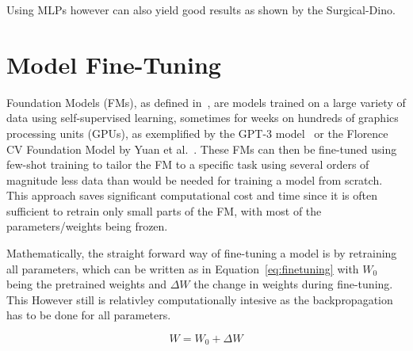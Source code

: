 Using MLPs however can also yield good results as shown by the Surgical-Dino.



\section{Model Fine-Tuning}\label{sec:model-fine-tuning}
Foundation Models (FMs), as defined in~\cite{Bommasani2021}, are models trained on a large variety of data using self-supervised learning, sometimes for weeks on hundreds of graphics processing units (GPUs), as exemplified by the GPT-3 model~\cite{Yuan2022} or the Florence CV Foundation Model by Yuan et al.~\cite{Yuan2021}.
These FMs can then be fine-tuned using few-shot training to tailor the FM to a specific task using several orders of magnitude less data than would be needed for training a model from scratch.
This approach saves significant computational cost and time since it is often sufficient to retrain only small parts of the FM, with most of the parameters/weights being frozen.

Mathematically, the straight forward way of fine-tuning a model is by retraining all parameters, which can be written as in Equation~\ref{eq:finetuning} with $W_0$ being the pretrained weights and $\Delta W$ the change in weights during fine-tuning.
This However still is relativley computationally intesive as the backpropagation has to be done for all parameters.

\begin{equation}
    W = W_0 + \Delta W
    \label{eq:finetuning}
\end{equation}

